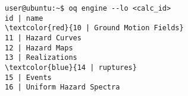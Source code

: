 \begin{Verbatim}[frame=single, commandchars=\\\{\}, fontsize=\small]
user@ubuntu:~$ oq engine --lo <calc_id>
id | name
\textcolor{red}{10 | Ground Motion Fields}
11 | Hazard Curves
12 | Hazard Maps
13 | Realizations
\textcolor{blue}{14 | ruptures}
15 | Events
16 | Uniform Hazard Spectra
\end{Verbatim}
